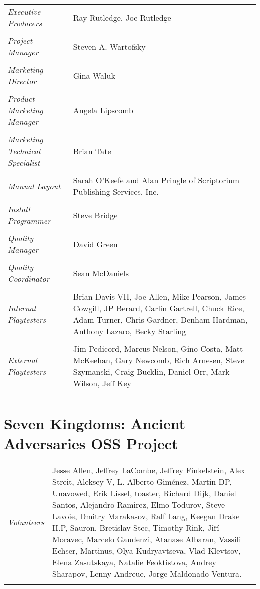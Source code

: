 \begin{tabular}{p{1in} p{3in}}
    \textit{Executive Producers} & Ray Rutledge, Joe Rutledge \\ \\
    \textit{Project Manager} & Steven A. Wartofsky \\ \\
    \textit{Marketing Director} & Gina Waluk \\ \\
    \textit{Product Marketing Manager} & Angela Lipscomb \\ \\
    \textit{Marketing Technical Specialist}    & Brian Tate \\ \\
    \textit{Manual Layout} & Sarah O’Keefe and Alan Pringle of Scriptorium Publishing Services, Inc. \\ \\
    \textit{Install Programmer}    & Steve Bridge \\ \\
    \textit{Quality Manager} & David Green \\ \\
    \textit{Quality Coordinator} & Sean McDaniels \\ \\
    \textit{Internal Playtesters} & Brian Davis VII, Joe Allen, Mike Pearson, James Cowgill, JP Berard, Carlin Gartrell, Chuck Rice, Adam Turner, Chris Gardner, Denham Hardman, Anthony Lazaro, Becky Starling \\ \\
    \textit{External Playtesters} & Jim Pedicord, Marcus Nelson, Gino Costa, Matt McKeehan, Gary Newcomb, Rich Arnesen, Steve Szymanski, Craig Bucklin, Daniel Orr, Mark Wilson, Jeff Key \\ \\
\end{tabular}

\clearpage

\section{\textsf{Seven Kingdoms: Ancient Adversaries OSS Project}}


\begin{tabular}{p{1in} p{3in}}
    \textit{Volunteers} & Jesse Allen, Jeffrey LaCombe, Jeffrey Finkelstein, Alex Streit, Aleksey V, L. Alberto Giménez, Martin DP, Unavowed, Erik Lissel, toaster, Richard Dijk, Daniel Santos, Alejandro Ramirez, Elmo Todurov, Steve Lavoie, Dmitry Marakasov, Ralf Lang, Keegan Drake H.P, Sauron, Bretislav Stec, Timothy Rink, Ji\u{r}í Moravec, Marcelo Gaudenzi, Atanase Albaran, Vassili Echser, Martinus, Olya Kudryavtseva, Vlad Klevtsov, Elena Zasutskaya, Natalie Feoktistova, Andrey Sharapov, Lenny Andreue, Jorge Maldonado Ventura. \\ \\
\end{tabular}